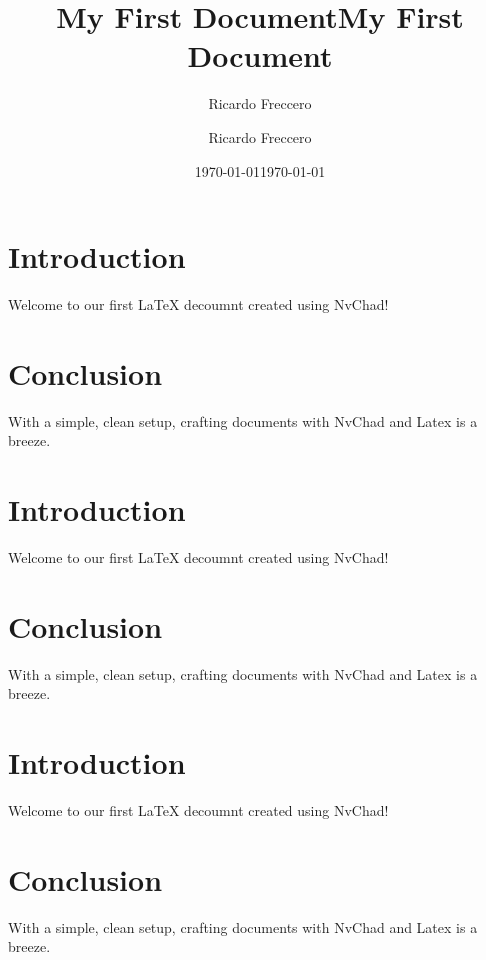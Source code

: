 \section{Introduction}
Welcome to our first LaTeX decoumnt created using NvChad!

\section{Conclusion}
With a simple, clean setup, crafting documents with NvChad and Latex is a breeze.




\title{My First Document}
\author{Ricardo Freccero}

\date{\today}
\maketitle

\section{Introduction}
Welcome to our first LaTeX decoumnt created using NvChad!

\section{Conclusion}
With a simple, clean setup, crafting documents with NvChad and Latex is a breeze.




\title{My First Document}
\author{Ricardo Freccero}

\date{\today}
\maketitle

\section{Introduction}
Welcome to our first LaTeX decoumnt created using NvChad!

\section{Conclusion}
With a simple, clean setup, crafting documents with NvChad and Latex is a breeze.

